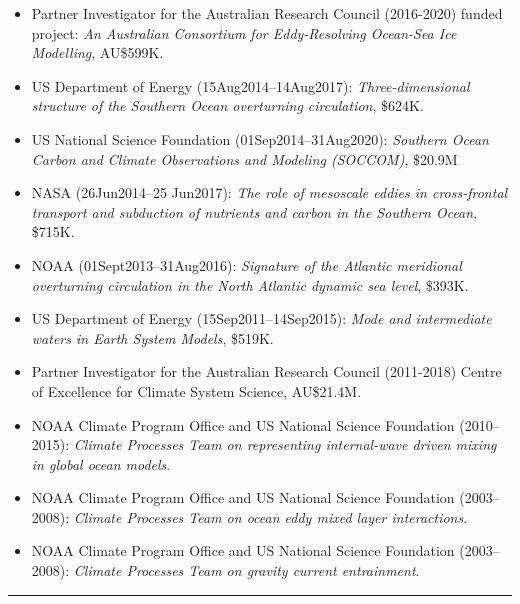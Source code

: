 \documentclass{article}
\begin{document}
\begin{itemize}[leftmargin=*]
\item Partner Investigator for the  Australian Research Council (2016-2020) funded project: {\it An Australian Consortium for Eddy-Resolving Ocean-Sea Ice Modelling}, AU\$599K.

\item US Department of Energy (15Aug2014--14Aug2017): {\it Three-dimensional structure of the Southern Ocean overturning circulation},  \$624K.

\item US National Science Foundation (01Sep2014--31Aug2020): {\it Southern Ocean Carbon and Climate Observations and Modeling (SOCCOM)}, \$20.9M

\item NASA (26Jun2014--25 Jun2017): {\it The role of mesoscale eddies in cross-frontal transport and subduction of nutrients and carbon in the Southern Ocean}, \$715K.

\item NOAA (01Sept2013--31Aug2016): {\it Signature of the Atlantic meridional overturning circulation in the North Atlantic dynamic sea level}, \$393K.

\item US Department of Energy (15Sep2011--14Sep2015): {\it Mode and intermediate waters in Earth System Models}, \$519K.

\item Partner Investigator for the Australian Research Council (2011-2018) Centre of Excellence for Climate System Science, AU\$21.4M.
  
\item NOAA Climate Program Office and US National Science Foundation (2010--2015): {\it Climate Processes Team on representing internal-wave driven mixing in global ocean models}.

\item NOAA Climate Program Office and US National Science Foundation (2003--2008): {\it Climate Processes Team on ocean eddy mixed layer interactions}.

\item NOAA Climate Program Office and US National Science Foundation (2003--2008): {\it Climate Processes Team on gravity current entrainment}.

\end{itemize}

%

\noindent\rule{\textwidth}{1pt}
\vspace{-1cm}
%

\end{document}
